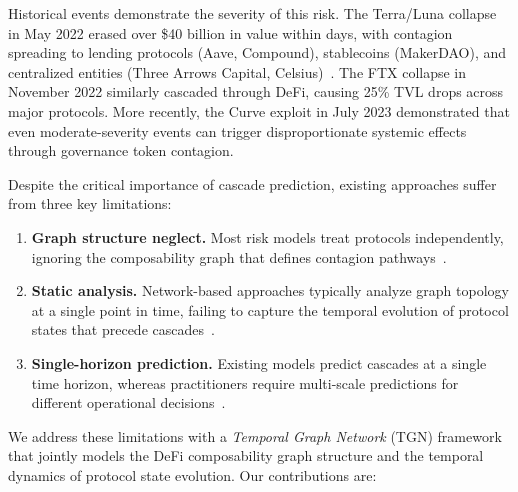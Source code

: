 \documentclass[journal]{IEEEtran}
\begin{document}
Historical events demonstrate the severity of this risk.
The Terra/Luna collapse in May 2022 erased over \$40 billion in value within days, with contagion spreading to lending protocols (Aave, Compound), stablecoins (MakerDAO), and centralized entities (Three Arrows Capital, Celsius)~\cite{briola2023anatomy}.
The FTX collapse in November 2022 similarly cascaded through DeFi, causing 25\% TVL drops across major protocols.
More recently, the Curve exploit in July 2023 demonstrated that even moderate-severity events can trigger disproportionate systemic effects through governance token contagion.

Despite the critical importance of cascade prediction, existing approaches suffer from three key limitations:
\begin{enumerate}
    \item \textbf{Graph structure neglect.} Most risk models treat protocols independently, ignoring the composability graph that defines contagion pathways~\cite{zhou2023sok}.
    \item \textbf{Static analysis.} Network-based approaches typically analyze graph topology at a single point in time, failing to capture the temporal evolution of protocol states that precede cascades~\cite{qin2021cefi}.
    \item \textbf{Single-horizon prediction.} Existing models predict cascades at a single time horizon, whereas practitioners require multi-scale predictions for different operational decisions~\cite{xu2023defi}.
\end{enumerate}

We address these limitations with a \emph{Temporal Graph Network} (TGN) framework that jointly models the DeFi composability graph structure and the temporal dynamics of protocol state evolution.
Our contributions are:
\end{document}
